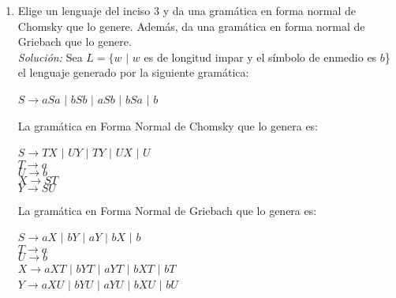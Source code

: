 \documentclass[letterpaper,11pt]{article}
\begin{document}
\begin{enumerate}
\begin{itemize}
       
       \end{itemize}
       
       \item Elige un lenguaje del inciso 3 y da una gramática en forma normal
       de Chomsky que lo genere. Además, da una gramática en forma normal de 
       Griebach que lo genere. \\
       \textit{Solución:} Sea $L = \{w$ $|$ $w$ es de longitud impar y el
       símbolo de enmedio es $b$\} el lenguaje generado por la siguiente
       gramática:
       \begin{center}
            $S \rightarrow aSa$ $|$ $bSb$ $|$ $aSb$ $|$ $bSa$ $|$ $b$
       \end{center}
       La gramática en Forma Normal de Chomsky que lo genera es:
       \begin{center}
           $S \rightarrow TX$ $|$ $UY$ $|$ $TY$ $|$ $UX$ $|$ $U$ \\
           $T \rightarrow a$ \\
           $U \rightarrow b$ \\
           $X \rightarrow ST$ \\
           $Y \rightarrow SU$ \\
       \end{center}
       
       \newpage
       La gramática en Forma Normal de Griebach que lo genera es:
       \begin{center}
           $S \rightarrow aX$ $|$ $bY$ $|$ $aY$ $|$ $bX$ $|$ $b$ \\
           $T \rightarrow a$ \\
           $U \rightarrow b$ \\
           $X \rightarrow aXT$ $|$ $bYT$ $|$ $aYT$ $|$ $bXT$ $|$ $bT$ \\
           $Y \rightarrow aXU$ $|$ $bYU$ $|$ $aYU$ $|$ $bXU$ $|$ $bU$
       \end{center}


\end{enumerate}
\end{document}
